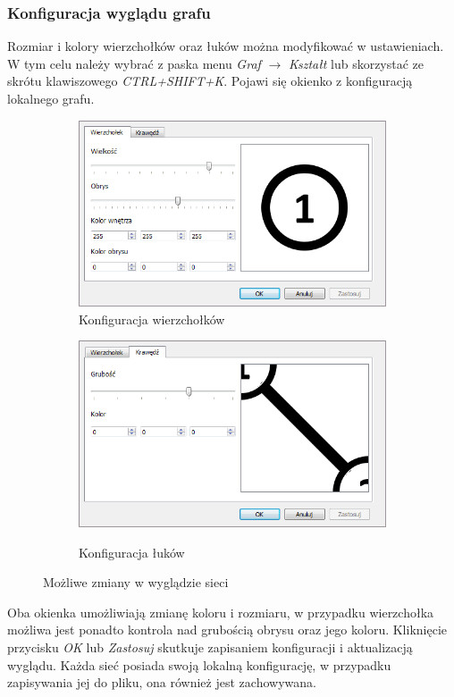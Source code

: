 \subsubsection{Konfiguracja wyglądu grafu}
Rozmiar i kolory wierzchołków oraz łuków można modyfikować w ustawieniach. W tym celu należy wybrać z paska menu \textit{Graf} $ \rightarrow $ \textit{Kształt} lub skorzystać ze skrótu klawiszowego \textit{CTRL+SHIFT+K}. Pojawi się okienko z konfiguracją lokalnego grafu.
\begin{figure}[H]
	\centering
	\begin{subfigure}{0.45\textwidth}
		\includegraphics[width=0.9\linewidth]{./img/spec_zew04_1.png}
		\caption{Konfiguracja wierzchołków}
		\label{fig:grafConfig1}
	\end{subfigure}
	\begin{subfigure}{0.45\textwidth}
		\includegraphics[width=0.9\linewidth]{./img/spec_zew04_2.png}
		\label{fig:grafConfig2}
		\caption{Konfiguracja łuków}
	\end{subfigure}
	\caption{Możliwe zmiany w wyglądzie sieci}
	\label{fig:grafConfig}
\end{figure}
Oba okienka umożliwiają zmianę koloru i rozmiaru, w przypadku wierzchołka możliwa jest ponadto kontrola nad grubością obrysu oraz jego koloru. Kliknięcie przycisku \textit{OK} lub \textit{Zastosuj} skutkuje zapisaniem konfiguracji i aktualizacją wyglądu. Każda sieć posiada swoją lokalną konfigurację, w przypadku zapisywania jej do pliku, ona również jest zachowywana.
